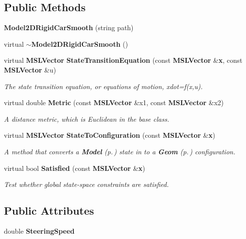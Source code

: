 \subsection*{Public Methods}
\begin{CompactItemize}
\item 
{\bf Model2DRigid\-Car\-Smooth} (string path)
\item 
virtual {\bf $\sim$Model2DRigid\-Car\-Smooth} ()
\item 
virtual {\bf MSLVector} {\bf State\-Transition\-Equation} (const {\bf MSLVector} \&{\bf x}, const {\bf MSLVector} \&u)
\begin{CompactList}\small\item\em The state transition equation, or equations of motion, xdot=f(x,u).\item\end{CompactList}\item 
virtual double {\bf Metric} (const {\bf MSLVector} \&x1, const {\bf MSLVector} \&x2)
\begin{CompactList}\small\item\em A distance metric, which is Euclidean in the base class.\item\end{CompactList}\item 
virtual {\bf MSLVector} {\bf State\-To\-Configuration} (const {\bf MSLVector} \&{\bf x})
\begin{CompactList}\small\item\em A method that converts a {\bf Model} {\rm (p.\,\pageref{classModel})} state in to a {\bf Geom} {\rm (p.\,\pageref{classGeom})} configuration.\item\end{CompactList}\item 
virtual bool {\bf Satisfied} (const {\bf MSLVector} \&{\bf x})
\begin{CompactList}\small\item\em Test whether global state-space constraints are satisfied.\item\end{CompactList}\end{CompactItemize}
\subsection*{Public Attributes}
\begin{CompactItemize}
\item 
double {\bf Steering\-Speed}
\end{CompactItemize}


